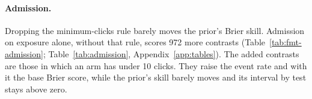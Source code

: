 \paragraph{Admission.}
Dropping the minimum-clicks rule barely moves the prior's Brier skill. Admission on exposure alone, without that rule, scores 972 more contrasts (Table~\ref{tab:fmt-admission}; Table~\ref{tab:admission}, Appendix~\ref{app:tables}).
The added contrasts are those in which an arm has under 10 clicks. They raise the event rate and with it the base Brier score, while the prior's skill barely moves and its interval by test stays above zero.

\begin{table}[t]\centering\scriptsize
\caption{How admission works on the headline archive: the rule used in the main run (1,000 impressions and 10 clicks in each of the two arms) set against admission on exposure by itself, leaving out the rule on minimum clicks (Table~\ref{tab:admission}, Appendix~\ref{app:tables}). The columns give the contrasts that were scored, then the base Brier score for the significant-positive event, and then the Brier skill for P1 and for P2 measured against it, carrying the bootstrap interval at 90 percent by test.}
\label{tab:fmt-admission}
\resizebox{\columnwidth}{!}{}
\end{table}

